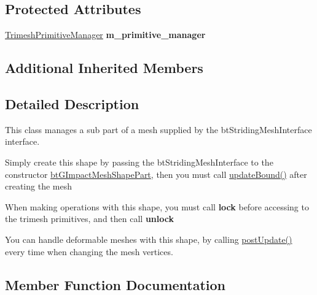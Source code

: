 \subsection*{Protected Attributes}
\begin{DoxyCompactItemize}
\item 
\mbox{\label{classbtGImpactMeshShapePart_aa5d55e9f76ff77f26db1658e4c7f021d}} 
\hyperlink{classbtGImpactMeshShapePart_1_1TrimeshPrimitiveManager}{Trimesh\+Primitive\+Manager} {\bfseries m\+\_\+primitive\+\_\+manager}
\end{DoxyCompactItemize}
\subsection*{Additional Inherited Members}


\subsection{Detailed Description}
This class manages a sub part of a mesh supplied by the bt\+Striding\+Mesh\+Interface interface. 


\begin{DoxyItemize}
\item Simply create this shape by passing the bt\+Striding\+Mesh\+Interface to the constructor \hyperlink{classbtGImpactMeshShapePart}{bt\+G\+Impact\+Mesh\+Shape\+Part}, then you must call \hyperlink{classbtGImpactShapeInterface_acb26c2d7a2aecabd06b996b72b848492}{update\+Bound()} after creating the mesh
\item When making operations with this shape, you must call {\bfseries lock} before accessing to the trimesh primitives, and then call {\bfseries unlock}
\item You can handle deformable meshes with this shape, by calling \hyperlink{classbtGImpactShapeInterface_ac430754948ac92d6f70b81e88416c96a}{post\+Update()} every time when changing the mesh vertices. 
\end{DoxyItemize}

\subsection{Member Function Documentation}
\mbox{\label{classbtGImpactMeshShapePart_a89fb18e93d2f4078576b6789e59891a2}} 
